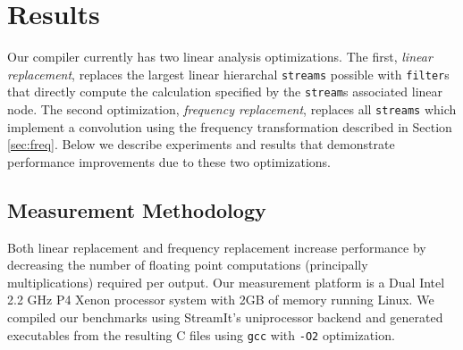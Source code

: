 \section{Results}
\label{sec:results}

Our compiler currently has two linear analysis optimizations. The first,
{\it linear replacement}, replaces the largest linear hierarchal {\tt streams} 
possible with {\tt filter}s that directly compute the calculation specified by 
the {\tt stream}s associated linear node. The second optimization, 
{\it frequency replacement}, replaces all {\tt streams} which implement 
a convolution using the frequency transformation described in 
Section \ref{sec:freq}. Below we describe experiments and results that demonstrate
performance improvements due to these two optimizations.


\subsection{Measurement Methodology}



Both linear replacement and frequency replacement increase performance by 
decreasing the number of floating point computations (principally multiplications) required per output.
Our measurement platform is a Dual Intel 2.2 GHz P4 Xenon processor system 
with 2GB of memory running Linux. We compiled our benchmarks using StreamIt's uniprocessor backend
and generated executables from the resulting C files using {\tt gcc} with {\tt -O2} optimization.

